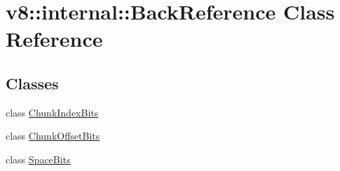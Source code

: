 \hypertarget{classv8_1_1internal_1_1_back_reference}{}\section{v8\+:\+:internal\+:\+:Back\+Reference Class Reference}
\label{classv8_1_1internal_1_1_back_reference}
\subsection*{Classes}
\begin{DoxyCompactItemize}
\item 
class \hyperlink{classv8_1_1internal_1_1_back_reference_1_1_chunk_index_bits}{Chunk\+Index\+Bits}
\item 
class \hyperlink{classv8_1_1internal_1_1_back_reference_1_1_chunk_offset_bits}{Chunk\+Offset\+Bits}
\item 
class \hyperlink{classv8_1_1internal_1_1_back_reference_1_1_space_bits}{Space\+Bits}
\end{DoxyCompactItemize}
